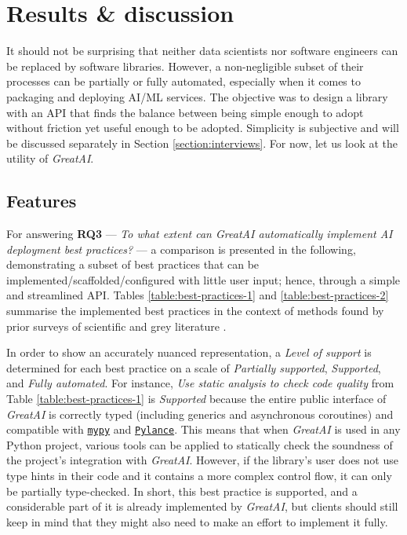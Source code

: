 \chapter{Results \& discussion} \label{chapter:interviews}

It should not be surprising that neither data scientists nor software engineers can be replaced by software libraries. However, a non-negligible subset of their processes can be partially or fully automated, especially when it comes to packaging and deploying AI/ML services. The objective was to design a library with an API that finds the balance between being simple enough to adopt without friction yet useful enough to be adopted. Simplicity is subjective and will be discussed separately in Section \ref{section:interviews}. For now, let us look at the utility of \textit{GreatAI}.

\section{Features} \label{section:features}

For answering \textbf{RQ3} --- \textit{To what extent can \textit{GreatAI} automatically implement AI deployment best practices?} --- a comparison is presented in the following, demonstrating a subset of best practices that can be implemented/scaffolded/configured with little user input; hence, through a simple and streamlined API. Tables \ref{table:best-practices-1} and \ref{table:best-practices-2} summarise the implemented best practices in the context of methods found by prior surveys of scientific and grey literature \cite{serban2020adoption,serban2021practices,john2020architecting}.

In order to show an accurately nuanced representation, a \textit{Level of support} is determined for each best practice on a scale of \textit{Partially supported}, \textit{Supported}, and \textit{Fully automated}. For instance, \textit{Use static analysis to check code quality} from Table \ref{table:best-practices-1} is \textit{Supported} because the entire public interface of \textit{GreatAI} is correctly typed (including generics and asynchronous coroutines) and compatible with \href{https://mypy.readthedocs.io/en/stable/index.html#}{\texttt{mypy}} and \href{https://marketplace.visualstudio.com/items?itemName=ms-python.vscode-pylance}{\texttt{Pylance}}. This means that when \textit{GreatAI} is used in any Python project, various tools can be applied to statically check the soundness of the project's integration with \textit{GreatAI}. However, if the library's user does not use type hints in their code and it contains a more complex control flow, it can only be partially type-checked. In short, this best practice is supported, and a considerable part of it is already implemented by \textit{GreatAI}, but clients should still keep in mind that they might also need to make an effort to implement it fully.


